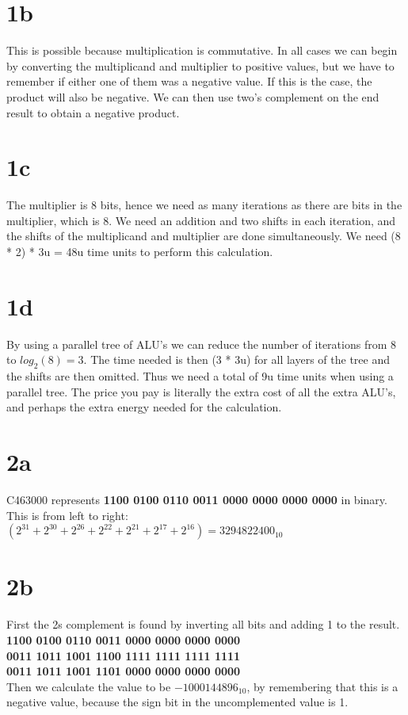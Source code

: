 \documentclass[10pt,a4paper]{article}
\begin{document}
	\section*{1b}
	This is possible because multiplication is commutative. In all cases we can begin by converting the multiplicand and multiplier to positive values, but we have to remember if either one of them was a negative value. If this is the case, the product will also be negative. We can then use two's complement on the end result to
	obtain a negative product.
	\section*{1c}
	The multiplier is 8 bits, hence we need as many iterations as there are bits in the multiplier, which is 8. We need an addition and two shifts in each iteration, and the shifts of the multiplicand and multiplier are done simultaneously. We need (8 * 2) * 3u  = 48u time units to perform this calculation.
	\section*{1d}
	By using a parallel tree of ALU's we can reduce the number of iterations from 8 to $log_{2}(8) = 3$. The time needed is then (3 *  3u) for all layers of the tree and the shifts are then omitted. Thus we need a total of 9u time units when using a parallel tree. The price you pay is literally the extra cost of all the extra ALU's, and perhaps the extra energy needed for the calculation.
	\section*{2a}
	C463000 represents \textbf{1100 0100 0110 0011 0000 0000 0000 0000} in binary. This is from left to right: $(2^{31} + 2^{30} + 2^{26} + 2^{22} + 2^{21} + 2^{17} + 2^{16}) = 3294822400_{10}$
	\section*{2b}
	First the 2s complement is found by inverting all bits and adding 1 to the result.
	\textbf{1100 0100 0110 0011 0000 0000 0000 0000} \\
	\textbf{0011 1011 1001 1100 1111 1111 1111 1111} \\
	\textbf{0011 1011 1001 1101 0000 0000 0000 0000} \\
	Then we calculate the value to be $-1000144896_{10}$, by remembering that this is a negative value, because the sign bit in the uncomplemented value is 1.
\end{document}
